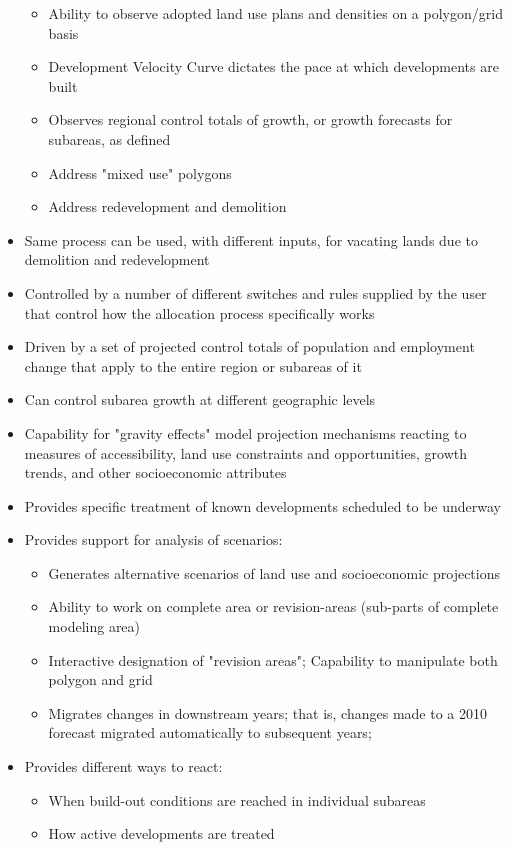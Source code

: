 \documentclass[titlepage]{article}
\begin{document}
\begin{itemize}
\begin{itemize}
\item Ability to observe adopted land use plans and densities on a polygon/grid basis
\item Development Velocity Curve dictates the pace at which developments are built
\item Observes regional control totals of growth, or growth forecasts for subareas, as defined
\item Address "mixed use" polygons
\item Address redevelopment and demolition
\end{itemize}
\item Same process can be used, with different inputs, for vacating lands due to demolition and redevelopment
\item Controlled by a number of different switches and rules supplied by the user that control how the allocation process specifically works
\item Driven by a set of projected control totals of population and employment change that apply to the entire region or subareas of it
\item Can control subarea growth at different geographic levels
\item Capability for  "gravity effects" model projection mechanisms reacting to measures of accessibility, land use constraints and opportunities, growth trends, and other socioeconomic attributes
\item Provides specific treatment of known developments scheduled to be underway
\item Provides support for analysis of scenarios:
\begin{itemize}
\item Generates alternative scenarios of land use and socioeconomic projections
\item Ability to work on complete area or revision-areas (sub-parts of complete modeling area)
\item Interactive designation of  "revision areas"; Capability to manipulate both polygon and grid
\item Migrates changes in downstream years; that is, changes made to a 2010 forecast migrated automatically to subsequent years;
\end{itemize}
\item Provides different ways to react:
\begin{itemize}
\item When build-out conditions are reached in individual subareas
\item How active developments are treated

\end{itemize}
\end{itemize}
\end{document}
